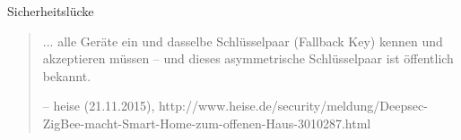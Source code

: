 \begin{frame}{Sicherheitslücke}
  \begin{quote}
    \normalsize
    ... alle Geräte ein und dasselbe Schlüsselpaar (Fallback Key) kennen und akzeptieren müssen – und dieses asymmetrische Schlüsselpaar ist öffentlich bekannt.
    \begin{flushright}
      \small
      -- heise (21.11.2015), http://www.heise.de/security/meldung/Deepsec-ZigBee-macht-Smart-Home-zum-offenen-Haus-3010287.html
    \end{flushright}
  \end{quote}
\end{frame}
